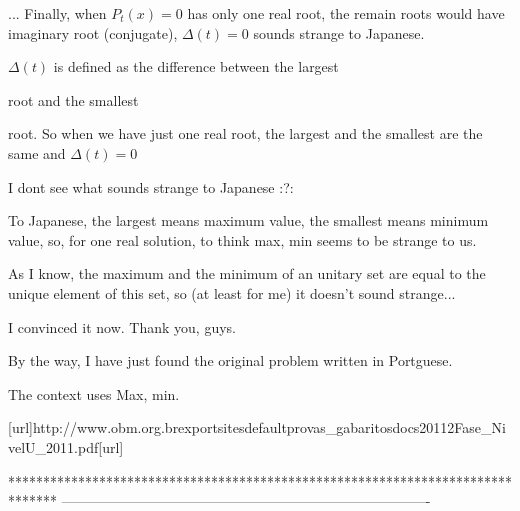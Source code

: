 \begin{solution}
	\begin{tcolorbox}...
Finally, when $P_t(x)=0$ has only one real root, the remain roots would have imaginary root (conjugate), $\Delta (t)=0$ sounds strange to Japanese.\end{tcolorbox}

$\Delta(t)$ is defined as the difference between the largest root and the smallest root. So when we have just one real root, the largest and the smallest are the same and $\Delta(t)=0$ 

I dont see what sounds strange to Japanese :?:
\end{solution}



\begin{solution}
	To Japanese, the largest means maximum value, the smallest means minimum value, so, for one real solution, to think max, min seems to be  strange to us.
\end{solution}



\begin{solution}
	As I know, the maximum and the minimum of an unitary set are equal to the unique element of this set, so (at least for me) it doesn't sound strange...
\end{solution}



\begin{solution}
	I convinced it now. Thank you, guys.

By the way, I have just found the original problem written in Portguese.

The context uses Max, min.

[url]http://www.obm.org.br\/export\/sites\/default\/provas_gabaritos\/docs\/2011\/2Fase_NivelU_2011.pdf[\/url]
\end{solution}
*******************************************************************************
-------------------------------------------------------------------------------

